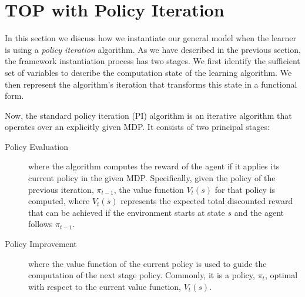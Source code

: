 
\section{TOP with Policy Iteration}\label{sec: TOP-PI}
\noindent 
In this section we discuss how we instantiate our general model when
the learner is using a \emph{policy iteration} algorithm.  As we have
described in the previous section, the framework instantiation process
has two stages. We first identify the sufficient set of variables to
describe the computation state of the learning algorithm. We then
represent the algorithm's iteration that transforms this state in a
functional form.

Now, the standard policy iteration (PI) algorithm is an iterative algorithm
that operates over an explicitly given MDP\cite{puterman_book_94}.  It
consists of two principal stages:
\begin{description}
\item[Policy Evaluation] where the algorithm computes the reward of
  the agent if it applies its current policy in the given
  MDP. Specifically, given the policy of the previous iteration,
  $\pi_{t-1}$, the value function $V_t(s)$ for that policy is
  computed, where $V_t(s)$ represents the expected total discounted
  reward that can be achieved if the environment starts at state $s$
  and the agent follows $\pi_{t-1}$.

\item[Policy Improvement]  where the value function
of the current policy is used to guide the computation of the next
stage policy. Commonly, it is a policy, $\pi_{t}$, optimal with
respect to the current value function, $V_t(s)$.
\end{description}


